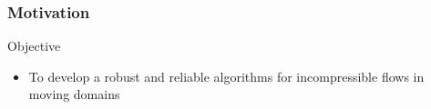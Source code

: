 \frametitle{Motivation}
 
 \onslide<+->
  \onslide<+->
\begin{block}{Objective}
\begin{itemize}
  \item To develop a robust and reliable algorithms for 
         {incompressible flows in moving domains}
\end{itemize}
\end{block}